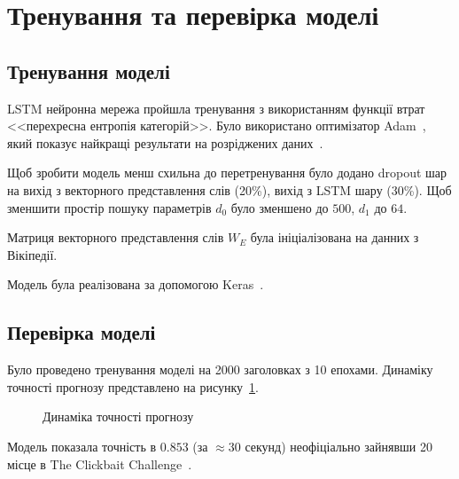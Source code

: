 \section{Тренування та перевірка моделі}
\subsection{Тренування моделі}
LSTM нейронна мережа пройшла тренування з використанням функції втрат <<перехресна ентропія категорій>>. Було використано оптимізатор Adam~\cite{Kingma2014}, який показує найкращі результати на розріджених даних~\cite{Ruder2016}. 

Щоб зробити модель менш схильна до перетренування було додано dropout шар на вихід з векторного представлення слів (20\%), вихід з LSTM шару (30\%). Щоб зменшити простір пошуку параметрів $d_0$ було зменшено до $500$, $d_1$ до $64$.

Матриця векторного представлення слів $W_E$ була ініціалізована на данних з Вікіпедії.

Модель була реалізована за допомогою Keras~\cite{Keras}.

\subsection{Перевірка моделі}
Було проведено тренування моделі на 2000 заголовках з 10 епохами. Динаміку точності прогнозу представлено на рисунку~\ref{fig:results_training}. 

\begin{figure}[H]
    \centering
  \caption{Динаміка точності прогнозу}
  \label{fig:results_training}
\end{figure}

Модель показала точність в $0.853$ (за $\approx 30$ секунд) неофіціально зайнявши 20 місце в The Clickbait Challenge~\cite{Clickbait2016}.

